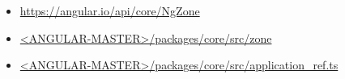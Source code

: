 \begin{itemize}
  \item \url{https://angular.io/api/core/NgZone}
\end{itemize}



\begin{itemize}
  \item \href{https://github.com/angular/angular/tree/master/packages/core/src/zone}
        {<ANGULAR-MASTER>/packages/core/src/zone}
\end{itemize}


\begin{itemize}
  \item \href{https://github.com/angular/angular/blob/master/packages/core/src/application_ref.ts}
        {<ANGULAR-MASTER>/packages/core/src/application\_ref.ts}
\end{itemize}








